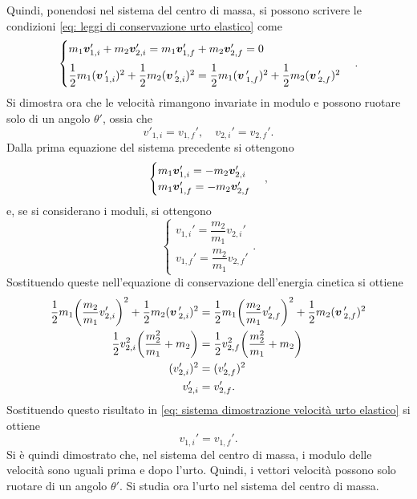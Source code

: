 Quindi, ponendosi nel sistema del centro di massa, si possono scrivere le condizioni \eqref{eq: leggi di conservazione urto elastico} come
\begin{equation}
    \begin{cases}
        m_1\bm{v}_{1,i}'+m_2\bm{v}_{2,i}'=m_1\bm{v}_{1,f}'+m_2\bm{v}_{2,f}'=0 \\[1.5ex]
        \dfrac{1}{2}m_1(\bm{v}\,'_{1,i})^2+\dfrac{1}{2}m_2(\bm{v}\,'_{2,i})^2=\dfrac{1}{2}m_1(\bm{v}\,'_{1,f})^2+\dfrac{1}{2}m_2(\bm{v}\,'_{2,f})^2
    \end{cases}.
\end{equation}
Si dimostra ora che le velocità rimangono invariate in modulo e possono ruotare solo di un angolo $\theta'$, ossia che
\begin{equation}
    v'_{1,i}=v_{1,f}',\quad v_{2,i}'=v_{2,f}'.
\end{equation}
Dalla prima equazione del sistema precedente si ottengono
\begin{equation}
    \begin{cases}
        m_1\bm{v}_{1,i}'=-m_2\bm{v}_{2,i}' \\
        m_1\bm{v}_{1,f}'=-m_2\bm{v}_{2,f}'
    \end{cases},
\end{equation}
e, se si considerano i moduli, si ottengono
\begin{equation}
    \begin{cases}
    \label{eq: sistema dimostrazione velocità urto elastico}
        v_{1,i}'=\dfrac{m_2}{m_1}v_{2,i}' \\[1.5ex]
        v_{1,f}'=\dfrac{m_2}{m_1}v_{2,f}'
    \end{cases}.
\end{equation}
Sostituendo queste nell'equazione di conservazione dell'energia cinetica si ottiene
\begin{equation}
    \begin{split}
        \dfrac{1}{2}m_1\bigg(\dfrac{m_2}{m_1}v_{2,i}'\bigg)^2+\dfrac{1}{2}m_2(\bm{v}\,'_{2,i})^2&=\dfrac{1}{2}m_1\bigg(\dfrac{m_2}{m_1}v_{2,f}'\bigg)^2+\dfrac{1}{2}m_2(\bm{v}\,'_{2,f})^2 \\
        \dfrac{1}{2}v_{2,i}^2\bigg(\frac{m_2^2}{m_1}+m_2\bigg)&=\dfrac{1}{2}v_{2,f}^2\bigg(\frac{m_2^2}{m_1}+m_2\bigg) \\
        (v_{2,i}')^2&=(v_{2,f}')^2 \\
        v_{2,i}'&=v_{2,f}'.
    \end{split}
\end{equation}
Sostituendo questo risultato in \eqref{eq: sistema dimostrazione velocità urto elastico} si ottiene
\begin{equation}
    v_{1,i}'=v_{1,f}'.
\end{equation}
Si è quindi dimostrato che, nel sistema del centro di massa, i modulo delle velocità sono uguali prima e dopo l'urto. Quindi, i vettori velocità possono solo ruotare di un angolo $\theta'$. Si studia ora l'urto nel sistema del centro di massa.

